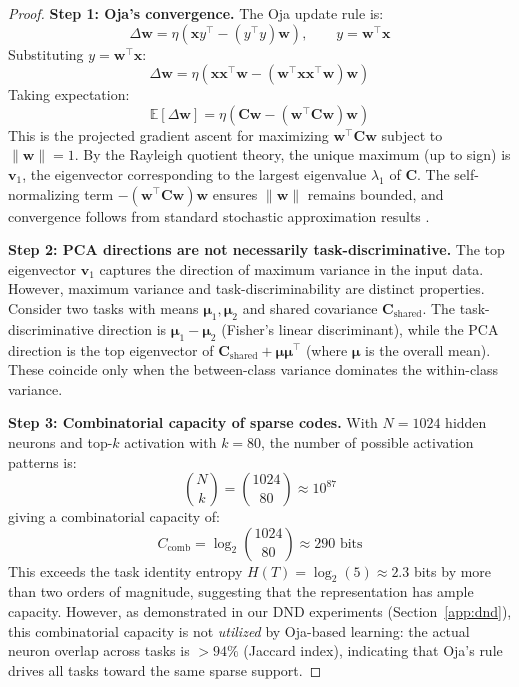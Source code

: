 \documentclass{article}
\begin{document}
\begin{proof}
\textbf{Step 1: Oja's convergence.}
The Oja update rule is:
\begin{equation}
    \Delta \mathbf{w} = \eta \left(\mathbf{x} y^\top - (y^\top y) \mathbf{w}\right), \qquad y = \mathbf{w}^\top \mathbf{x}
\end{equation}
Substituting $y = \mathbf{w}^\top \mathbf{x}$:
\begin{equation}
    \Delta \mathbf{w} = \eta \left(\mathbf{x}\mathbf{x}^\top \mathbf{w} - (\mathbf{w}^\top \mathbf{x}\mathbf{x}^\top \mathbf{w}) \mathbf{w}\right)
\end{equation}
Taking expectation:
\begin{equation}
    \mathbb{E}[\Delta \mathbf{w}] = \eta \left(\mathbf{C}\mathbf{w} - (\mathbf{w}^\top \mathbf{C}\mathbf{w}) \mathbf{w}\right)
\end{equation}
This is the projected gradient ascent for maximizing $\mathbf{w}^\top \mathbf{C}\mathbf{w}$ subject to $\|\mathbf{w}\| = 1$. By the Rayleigh quotient theory, the unique maximum (up to sign) is $\mathbf{v}_1$, the eigenvector corresponding to the largest eigenvalue $\lambda_1$ of $\mathbf{C}$. The self-normalizing term $-(\mathbf{w}^\top \mathbf{C}\mathbf{w})\mathbf{w}$ ensures $\|\mathbf{w}\|$ remains bounded, and convergence follows from standard stochastic approximation results \citep{oja1982simplified}.

\textbf{Step 2: PCA directions are not necessarily task-discriminative.}
The top eigenvector $\mathbf{v}_1$ captures the direction of maximum variance in the input data. However, maximum variance and task-discriminability are distinct properties. Consider two tasks with means $\boldsymbol{\mu}_1, \boldsymbol{\mu}_2$ and shared covariance $\mathbf{C}_{\mathrm{shared}}$. The task-discriminative direction is $\boldsymbol{\mu}_1 - \boldsymbol{\mu}_2$ (Fisher's linear discriminant), while the PCA direction is the top eigenvector of $\mathbf{C}_{\mathrm{shared}} + \boldsymbol{\mu}\boldsymbol{\mu}^\top$ (where $\boldsymbol{\mu}$ is the overall mean). These coincide only when the between-class variance dominates the within-class variance.

\textbf{Step 3: Combinatorial capacity of sparse codes.}
With $N = 1024$ hidden neurons and top-$k$ activation with $k = 80$, the number of possible activation patterns is:
\begin{equation}
    \binom{N}{k} = \binom{1024}{80} \approx 10^{87}
\end{equation}
giving a combinatorial capacity of:
\begin{equation}
    C_{\mathrm{comb}} = \log_2 \binom{1024}{80} \approx 290 \text{ bits}
\end{equation}
This exceeds the task identity entropy $H(T) = \log_2(5) \approx 2.3$ bits by more than two orders of magnitude, suggesting that the representation has ample capacity. However, as demonstrated in our DND experiments (Section~\ref{app:dnd}), this combinatorial capacity is not \emph{utilized} by Oja-based learning: the actual neuron overlap across tasks is $> 94\%$ (Jaccard index), indicating that Oja's rule drives all tasks toward the same sparse support.
\end{proof}
\end{document}
